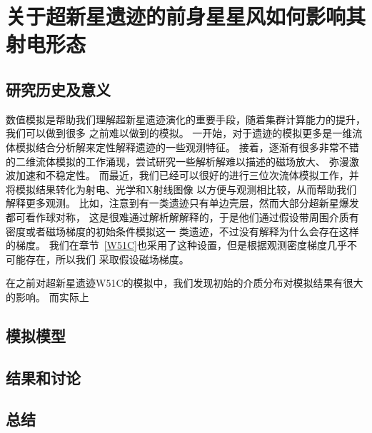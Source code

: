 \chapter{关于超新星遗迹的前身星星风如何影响其射电形态}
\label{SW}

\section{研究历史及意义}
\label{SWintro}
数值模拟是帮助我们理解超新星遗迹演化的重要手段，随着集群计算能力的提升，我们可以做到很多
之前难以做到的模拟。
一开始，对于遗迹的模拟更多是一维流体模拟结合分析解来定性解释遗迹的一些观测特征。
接着，逐渐有很多非常不错的二维流体模拟的工作涌现，尝试研究一些解析解难以描述的磁场放大、
弥漫激波加速和不稳定性\citep{Jun1996,Kang2006,Fang2012}。
而最近，我们已经可以很好的进行三位次流体模拟工作，并将模拟结果转化为射电、光学和X射线图像
以方便与观测相比较\citep{Orlando2007,Meyer2015,Zhang2017}，从而帮助我们解释更多观测。
比如，\citet{Orlando2007}注意到有一类遗迹只有单边壳层，然而大部分超新星爆发都可看作球对称，
这是很难通过解析解解释的，于是他们通过假设带周围介质有密度或者磁场梯度的初始条件模拟这一
类遗迹，不过没有解释为什么会存在这样的梯度。
我们在章节~\ref{W51C}也采用了这种设置，但是根据观测密度梯度几乎不可能存在，所以我们
采取假设磁场梯度。


在之前对超新星遗迹W51C的模拟中，我们发现初始的介质分布对模拟结果有很大的影响。
而实际上


\section{模拟模型}
\label{SWmod}

\section{结果和讨论}
\label{SWres}

\section{总结}
\label{SWsum}
